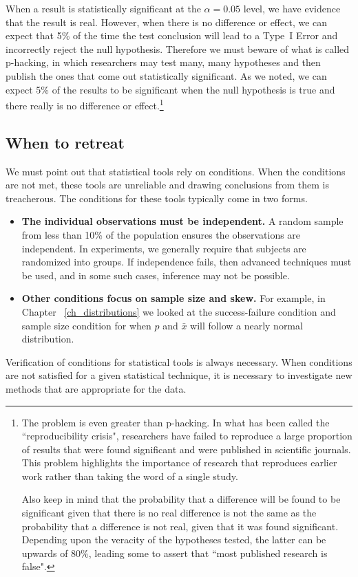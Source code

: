 When a result is statistically significant at the $\alpha=0.05$ level, we have evidence that the result is real.
However, when there is no difference or effect, we can expect that 5\% of the time the test conclusion will lead to a Type~I Error and incorrectly reject the null hypothesis.
Therefore we must beware of what is called p-hacking, in which researchers may test many, many hypotheses and then publish the ones that come out statistically significant.
As we noted, we can expect 5\% of the results to be significant when the null hypothesis is true and there really is no difference or effect.\footnote{
The problem is even greater than p-hacking.  In what has been called the ``reproducibility crisis", researchers have failed to reproduce a large proportion of results that were found significant and were published in scientific journals.
This problem highlights the importance of research that
reproduces earlier work rather than taking the word of
a single study.

Also keep in mind that the probability that a difference will be found to be significant given that there is no real difference is not the same as the probability that a difference is not real, given that it was found significant.
Depending upon the veracity of the hypotheses tested, the latter can be upwards of 80\%, leading some to assert that ``most published research is false". 
}

\subsection{When to retreat}
\label{whenToRetreat}

We must point out that statistical tools rely on conditions. When the conditions are not met, these tools are unreliable and drawing conclusions from them is treacherous. The conditions for these tools typically come in two forms.
\begin{itemize}
\setlength{\itemsep}{0mm}
\item \textbf{The individual observations must be independent.} A random sample from less than 10\% of the population ensures the observations are independent. In experiments, we generally require that subjects are randomized into groups. If independence fails, then advanced techniques must be used, and in some such cases, inference may not be possible.
\item \textbf{Other conditions focus on sample size and skew.} For example, in Chapter ~\ref{ch_distributions} we looked at the success-failure condition and sample size condition for when $\hat{p}$ and $\bar{x}$ will follow a nearly normal distribution.

\end{itemize}
Verification of conditions for statistical tools is always necessary. When conditions are not satisfied for a given statistical technique, it is necessary to investigate new methods that are appropriate for the data. 

